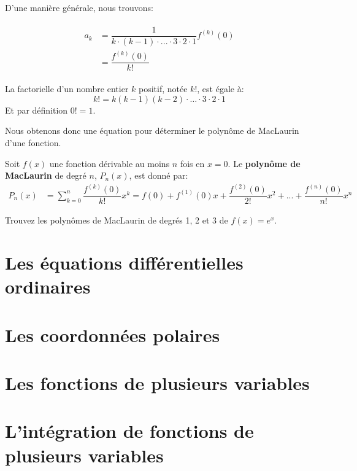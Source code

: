 \documentclass[]{book}
\theoremstyle{definition}
\theoremstyle{definition}
\theoremstyle{definition}
\theoremstyle{remark}
\let\BeginKnitrBlock\begin \let\EndKnitrBlock\end
\begin{document}
D'une manière générale, nous trouvons:

\begin{align}
\begin{split}
a_k &= \dfrac{1}{k\cdot (k-1)\cdot ...\cdot 3\cdot 2\cdot 1}f^{(k)}(0) \\
&= \dfrac{f^{(k)}(0)}{k!}
\end{split}
\end{align}

\BeginKnitrBlock{remark}[Factorielle]
{}La factorielle d'un nombre
entier \(k\) positif, notée \(k!\), est égale à: \begin{equation*}
k! = k(k-1)(k-2)\cdot\ldots\cdot 3\cdot 2\cdot 1
\end{equation*} Et par définition \(0!=1\).
\EndKnitrBlock{remark}

Nous obtenons donc une équation pour déterminer le polynôme de MacLaurin
d'une fonction.

\BeginKnitrBlock{definition}[Polynôme de MacLaurin]
\protect\hypertarget{def:unnamed-chunk-3}{}{\label{def:unnamed-chunk-3}
{} }Soit \(f(x)\) une fonction
dérivable au moins \(n\) fois en \(x=0\). Le \textbf{polynôme de
MacLaurin} de degré \(n\), \(P_n(x)\), est donné par: \begin{align*}
P_n(x)&=\sum_{k=0}^n\dfrac{f^{(k)}(0)}{k!}x^k=f(0)+f^{(1)}(0)x+\dfrac{f^{(2)}(0)}{2!}x^2+...+\dfrac{f^{(n)}(0)}{n!}x^n
\end{align*}
\EndKnitrBlock{definition}

\BeginKnitrBlock{example}
\protect\hypertarget{exm:unnamed-chunk-4}{}{\label{exm:unnamed-chunk-4}
}Trouvez les polynômes de MacLaurin de degrés 1, 2 et 3 de \(f(x)=e^x\).
\EndKnitrBlock{example}

\hypertarget{edo}{%
\chapter{Les équations différentielles ordinaires}\label{edo}}

\hypertarget{coordpolaires}{%
\chapter{Les coordonnées polaires}\label{coordpolaires}}

\hypertarget{fctvar}{%
\chapter{Les fonctions de plusieurs variables}\label{fctvar}}

\hypertarget{intfct}{%
\chapter{L'intégration de fonctions de plusieurs
variables}\label{intfct}}


\end{document}

